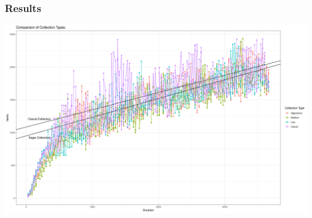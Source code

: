 \documentclass{beamer}
\begin{document}
    \begin{frame}
        \frametitle{Results}
        \includegraphics[width=\textwidth]{CollectionType3}
    \end{frame}

\end{document}
